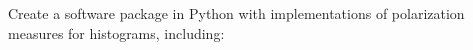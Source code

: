 \documentclass[preview]{standalone}
\begin{document}
Create a software package in Python with implementations of polarization measures for histograms, including:\\
\end{document}
